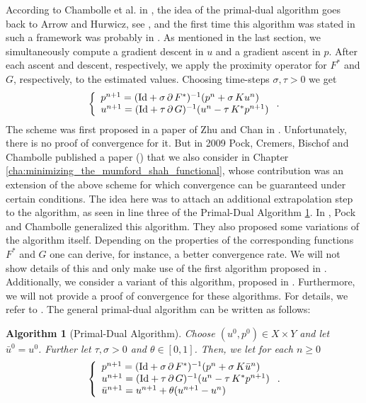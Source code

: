\documentclass[abstracton]{scrreprt}
\newtheorem{algorithm}[theorem]{Algorithm}
\begin{document}
        According to Chambolle et al. in \cite{Chambolle-et-al-10}, the idea of the primal-dual algorithm goes back to Arrow and Hurwicz, see \cite{Arrow-Hurwicz}, and the first time this algorithm was stated in such a framework was probably in \cite{Appleton-Talbot}. As mentioned in the last section, we simultaneously compute a gradient descent in $u$ and a gradient ascent in $p$. After each ascent and descent, respectively, we apply the proximity operator for $F^{\ast}$ and $G$, respectively, to the estimated values. Choosing time-steps $\sigma, \tau > 0$ we get
            $$
                \left\{ 
                    \begin{array}{l l}
                        p^{n+1} = (\textnormal{Id} + \sigma\,\partial\,F^{\ast})^{-1}(p^{n} + \sigma\,Ku^{n})\\
                        u^{n+1} = (\textnormal{Id} + \tau\,\partial\,G)^{-1}(u^{n} - \tau\,K^{\ast}p^{n+1})
                  \end{array}
                \right. .
            $$
        The scheme was first proposed in a paper of Zhu and Chan in \cite{Zhu-Chan}. Unfortunately, there is no proof of convergence for it. But in 2009 Pock, Cremers, Bischof and Chambolle published a paper (\cite{Pock-et-al-iccv09}) that we also consider in Chapter \ref{cha:minimizing_the_mumford_shah_functional}, whose contribution was an extension of the above scheme for which convergence can be guaranteed under certain conditions. The idea here was to attach an additional extrapolation step to the algorithm, as seen in line three of the Primal-Dual Algorithm \ref{alg:primal_dual_algorithm}. In \cite{Chambolle10afirst-order}, Pock and Chambolle generalized this algorithm. They also proposed some variations of the algorithm itself. Depending on the properties of the corresponding functions $F^{\ast}$ and $G$ one can derive, for instance, a better convergence rate. We will not show details of this and only make use of the first algorithm proposed in \cite{Chambolle10afirst-order}. Additionally, we consider a variant of this algorithm, proposed in \cite{Strekalovskiy-Cremers-eccv14}. Furthermore, we will not provide a proof of convergence for these algorithms. For details, we refer to \cite{Chambolle10afirst-order}. The general primal-dual algorithm can be written as follows:
        \begin{algorithm}[Primal-Dual Algorithm]
        \label{alg:primal_dual_algorithm}
            Choose $(u^{0}, p^{0}) \in X \times Y$ and let $\bar{u}^{0} = u^{0}$. Further let $\tau, \sigma > 0$ and $\theta \in [0, 1]$. Then, we let for each $n \ge 0$
                $$
                    \left\{ 
                        \begin{array}{l l}
                            p^{n+1} = (\textnormal{Id} + \sigma\,\partial\,F^{\ast})^{-1}(p^{n} + \sigma\,K\bar{u}^{n}) \\
                            u^{n+1} = (\textnormal{Id} + \tau\,\partial\,G)^{-1}(u^{n} - \tau\,K^{\ast}p^{n+1}) \\
                            \bar{u}^{n+1} = u^{n+1} + \theta (u^{n+1} - u^{n})
                        \end{array}
                    \right. .
                $$
        \end{algorithm}
\end{document}
